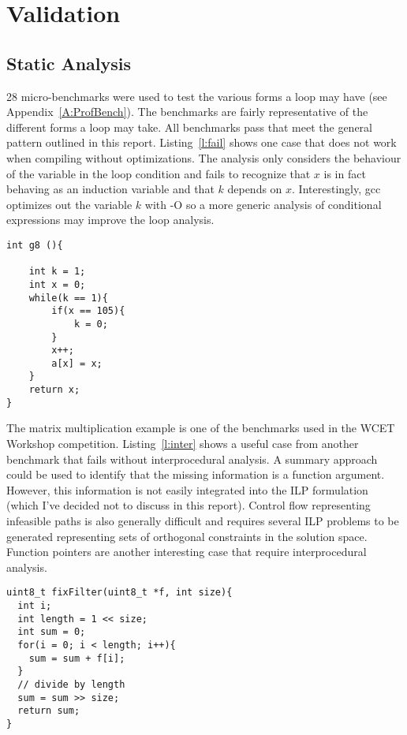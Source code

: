 

\section{Validation}
\subsection{Static Analysis}
28 micro-benchmarks were used to test the various forms a loop may have (see Appendix~\ref{A:ProfBench}). The benchmarks are fairly representative of the different forms a loop may take. All benchmarks pass that meet the general pattern outlined in this report. Listing~\ref{l:fail} shows one case that does not work when compiling without optimizations. The analysis only considers the behaviour of the variable in the loop condition and fails to recognize that $x$ is in fact behaving as an induction variable and that $k$ depends on $x$. Interestingly, gcc optimizes out the variable $k$ with -O so a more generic analysis of conditional expressions may improve the loop analysis.

\begin{lstlisting}[caption={Indirect test on induction variable fails.},label=l:fail]
int g8 (){

	int k = 1;
	int x = 0;
	while(k == 1){
		if(x == 105){
			k = 0;
		}
		x++;
		a[x] = x;
	}
	return x;
}
\end{lstlisting}

The matrix multiplication example is one of the benchmarks used in the WCET Workshop competition. Listing~\ref{l:inter} shows a useful case from another benchmark that fails without interprocedural analysis. A summary approach could be used to identify that the missing information is a function argument. However, this information is not easily integrated into the ILP formulation (which I've decided not to discuss in this report). Control flow representing infeasible paths is also generally difficult and requires several ILP problems to be generated representing sets of orthogonal constraints in the solution space. Function pointers are another interesting case that require interprocedural analysis.

\begin{lstlisting}[caption={Interprocedural analysis is necessary to analyze programs that call a function which takes the threshold as an argument.},label={l:inter}]
uint8_t fixFilter(uint8_t *f, int size){
  int i;
  int length = 1 << size;
  int sum = 0;
  for(i = 0; i < length; i++){
    sum = sum + f[i];	
  }   
  // divide by length
  sum = sum >> size;
  return sum;
}
\end{lstlisting}

